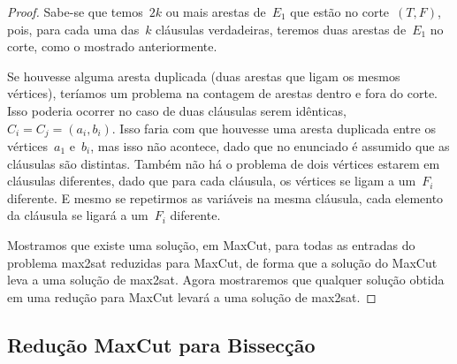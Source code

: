 \begin{proof}
		Sabe-se que temos~$2k$ ou mais arestas de~$E_1$ que estão no
		corte~$(T,F)$, pois, para cada uma das~$k$ cláusulas
		verdadeiras, teremos duas arestas de~$E_1$ no corte, como
		o mostrado anteriormente.

		Se houvesse alguma aresta duplicada (duas arestas que ligam
		os mesmos vértices), teríamos um problema na contagem de
		arestas dentro e fora do corte.
		Isso poderia ocorrer no caso de duas cláusulas serem 
		idênticas,~${C_i=C_j=(a_i,b_i)}$.
		Isso faria com que houvesse uma aresta duplicada entre
		os vértices~$a_1$ e~$b_i$, mas isso não acontece, dado que
		no enunciado é assumido que as cláusulas são distintas.
		Também não há o problema de dois vértices estarem em cláusulas
		diferentes, dado que para cada cláusula, os vértices se ligam
		a um~$F_i$ diferente.
		E mesmo se repetirmos as variáveis na mesma cláusula, cada
		elemento da cláusula se ligará a um~$F_i$ diferente.

		\bigskip

		Mostramos que existe uma solução, em MaxCut, 
		para todas as entradas do
		problema {\sc max2sat} reduzidas para MaxCut, de forma que
		a solução do MaxCut leva a uma solução de {\sc max2sat}.
		Agora mostraremos que qualquer solução obtida em 
		uma redução para MaxCut levará a uma solução de {\sc max2sat}.
	\end{proof}

\subsection{Redução MaxCut para Bissecção}




	

